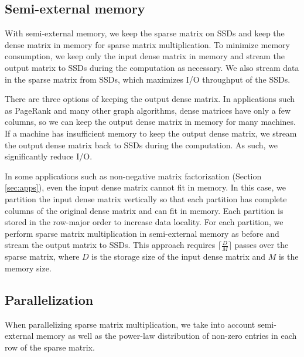 
\subsection{Semi-external memory}
With semi-external memory, we keep the sparse matrix on SSDs and keep the dense
matrix in memory for sparse matrix multiplication. To minimize memory
consumption, we keep only the input dense matrix in memory and
stream the output matrix to SSDs during the computation as necessary. We also stream
data in the sparse matrix from SSDs, which maximizes I/O throughput of the SSDs.

There are three options of keeping the output dense matrix. In applications
such as PageRank and many other graph
algorithms, dense matrices have only a few columns, so we can keep the output
dense matrix in memory for many machines. If a machine has insufficient
memory to keep the output dense matrix, we stream the output dense matrix
back to SSDs during the computation. As such, we significantly reduce I/O.

In some applications such as non-negative matrix factorization (Section
\ref{sec:apps}), even the input dense matrix cannot fit in memory. In this case,
we partition the input dense matrix vertically so
that each partition has complete columns of the original dense matrix and can
fit in memory. Each partition is stored in the row-major order to increase
data locality. For each partition, we perform sparse matrix multiplication
in semi-external memory as before and stream the output matrix to SSDs.
This approach requires $\lceil \frac{D}{M} \rceil$ passes over the sparse matrix,
where $D$ is the storage size of the input dense matrix and $M$ is the memory
size.

\subsection{Parallelization}
When parallelizing sparse matrix multiplication, we take into account
semi-external memory as well as the power-law distribution of non-zero entries
in each row of the sparse matrix.

